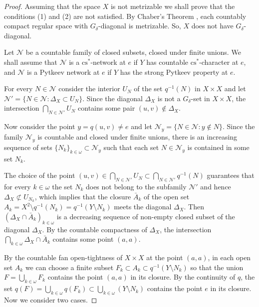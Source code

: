 \documentclass{amsart}
\theoremstyle{definition}
\begin{document}
\begin{proof} Assuming that the space $X$ is not metrizable we shall prove that the conditions (1) and (2) are not satisfied. By Chaber's Theorem \cite[2.14]{Gru}, each countably compact regular space with  $G_\delta$-diagonal is metrizable. So, $X$ does not have $G_\delta$-diagonal.

Let $\mathcal N$ be a countable family of closed subsets, closed under finite unions. We shall assume that $\mathcal N$ is a ${\mathrm{cs}}^*$-network at $e$ if $Y$ has countable ${\mathrm{cs}}^*$-character at $e$, and  $\mathcal N$ is a Pytkeev network at $e$ if $Y$ has the strong Pytkeev property at $e$.

For every $N\in\mathcal N$ consider the interior $U_N$ of the set $q^{-1}(N)$ in $X\times X$ and let $\mathcal N'=\{N\in\mathcal N:\Delta_X\subset U_N\}$. Since the diagonal $\Delta_X$ is not a $G_\delta$-set in $X\times X$, the intersection $\bigcap_{N\in\mathcal N'}U_N$ contains some pair $(u,v)\notin\Delta_X$.

Now consider the point $y=q(u,v)\ne e$ and let $\mathcal N_y=\{N\in\mathcal N:y\notin N\}$. Since the family $\mathcal N_y$ is countable and closed under finite unions, there is an increasing sequence of sets $\{N_k\}_{k\in{\omega}}\subset\mathcal N_y$ such that each set $N\in\mathcal N_y$ is contained in some set $N_k$.

The choice of the point $(u,v)\in\bigcap_{N\in\mathcal N'}U_N\subset\bigcap_{N\in\mathcal N'}q^{-1}(N)$ guarantees that for every $k\in{\omega}$ the set $N_k$ does not belong to the subfamily $\mathcal N'$ and hence $\Delta_X\not\subset U_{N_k}$, which implies that the closure $\bar A_k$ of the open set $A_k=X^2\setminus q^{-1}(N_k)=q^{-1}(Y\setminus N_k)$ meets the diagonal $\Delta_X$.
Then $(\Delta_X\cap\bar A_k)_{k\in{\omega}}$ is a decreasing sequence of
non-empty closed subset of the diagonal $\Delta_X$. By the countable compactness of $\Delta_X$, the intersection $\bigcap_{k\in{\omega}}\Delta_X\cap\bar A_k$ contains some point $(a,a)$.

By the countable fan open-tightness of $X\times X$ at the point $(a,a)$, in each open set $A_k$ we can choose a finite subset $F_k\subset A_k\subset q^{-1}(Y\setminus N_k)$ so that the union $F=\bigcup_{k\in{\omega}}F_k$ contains the point $(a,a)$ in its closure. By the continuity of $q$, the set $q(F)=\bigcup_{k\in{\omega}}q(F_k)\subset \bigcup_{k\in{\omega}}(Y\setminus N_k)$ contains the point $e$ in its closure. Now we consider two cases.
\smallskip


\end{proof}
\end{document}
